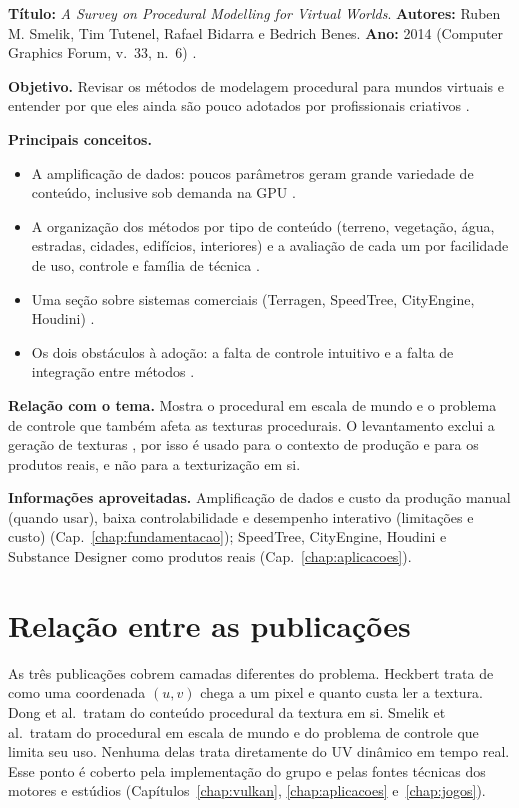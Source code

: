 \textbf{Título:} \textit{A Survey on Procedural Modelling for Virtual Worlds}. \textbf{Autores:} Ruben M. Smelik, Tim Tutenel, Rafael Bidarra e Bedrich Benes. \textbf{Ano:} 2014 (Computer Graphics Forum, v.~33, n.~6) \cite{smelik2014}.

\textbf{Objetivo.} Revisar os métodos de modelagem procedural para mundos virtuais e entender por que eles ainda são pouco adotados por profissionais criativos \cite[p.~1]{smelik2014}.

\textbf{Principais conceitos.}
\begin{itemize}
    \item A amplificação de dados: poucos parâmetros geram grande variedade de conteúdo, inclusive sob demanda na GPU \cite[p.~1]{smelik2014}.
    \item A organização dos métodos por tipo de conteúdo (terreno, vegetação, água, estradas, cidades, edifícios, interiores) e a avaliação de cada um por facilidade de uso, controle e família de técnica \cite[p.~2]{smelik2014}.
    \item Uma seção sobre sistemas comerciais (Terragen, SpeedTree, CityEngine, Houdini) \cite[pp.~10--12]{smelik2014}.
    \item Os dois obstáculos à adoção: a falta de controle intuitivo e a falta de integração entre métodos \cite[pp.~12--15]{smelik2014}.
\end{itemize}

\textbf{Relação com o tema.} Mostra o procedural em escala de mundo e o problema de controle que também afeta as texturas procedurais. O levantamento exclui a geração de texturas \cite[p.~2]{smelik2014}, por isso é usado para o contexto de produção e para os produtos reais, e não para a texturização em si.

\textbf{Informações aproveitadas.} Amplificação de dados e custo da produção manual (quando usar), baixa controlabilidade e desempenho interativo (limitações e custo) (Cap.~\ref{chap:fundamentacao}); SpeedTree, CityEngine, Houdini e Substance Designer como produtos reais (Cap.~\ref{chap:aplicacoes}).

\section{Relação entre as publicações}

As três publicações cobrem camadas diferentes do problema. Heckbert trata de como uma coordenada \((u,v)\) chega a um pixel e quanto custa ler a textura. Dong et al.\ tratam do conteúdo procedural da textura em si. Smelik et al.\ tratam do procedural em escala de mundo e do problema de controle que limita seu uso. Nenhuma delas trata diretamente do UV dinâmico em tempo real. Esse ponto é coberto pela implementação do grupo e pelas fontes técnicas dos motores e estúdios (Capítulos~\ref{chap:vulkan}, \ref{chap:aplicacoes} e~\ref{chap:jogos}).
